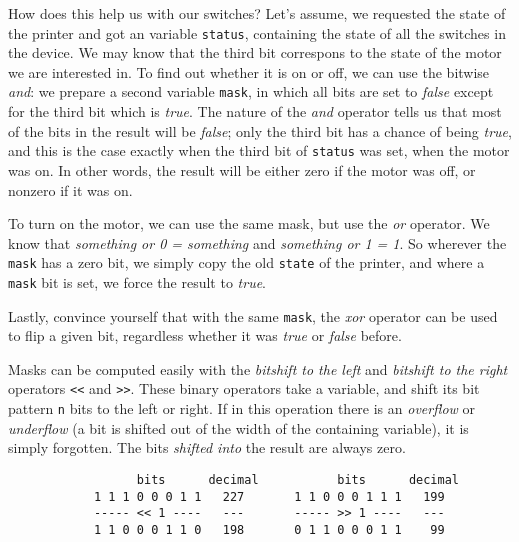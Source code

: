 {How does this help us with our switches? Let's assume, we requested the state of the printer and got an  variable \texttt{status}, containing the state of all the switches in the device. We may know that the third bit correspons to the state of the motor we are interested in. To find out whether it is on or off, we can use the bitwise \emph{and}: we prepare a second  variable \texttt{mask}, in which all bits are set to \emph{false} except for the third bit which is \emph{true}. The nature of the \emph{and} operator tells us that most of the bits in the result will be \emph{false}; only the third bit has a chance of being \emph{true}, and this is the case exactly when the third bit of \texttt{status} was set, \ie when the motor was on. In other words, the result will be either zero if the motor was off, or nonzero if it was on.

To turn on the motor, we can use the same mask, but use the \emph{or} operator. We know that \emph{something or 0 = something} and \emph{something or 1 = 1}. So wherever the \texttt{mask} has a zero bit, we simply copy the old \texttt{state} of the printer, and where a \texttt{mask} bit is set, we force the result to \emph{true}.

Lastly, convince yourself that with the same \texttt{mask}, the \emph{xor} operator can be used to flip a given bit, regardless whether it was \emph{true} or \emph{false} before.

Masks can be computed easily with the \emph{bitshift to the left} and \emph{bitshift to the right} operators \texttt{<{}<} and \texttt{>{}>}. These binary operators take a variable, and shift its bit pattern \texttt{n} bits to the left or right. If in this operation there is an \emph{overflow} or \emph{underflow} (a bit is shifted out of the width of the containing variable), it is simply forgotten. The bits \emph{shifted into} the result are always zero.

\begin{defbox}
\begin{verbatim}
                  bits      decimal           bits      decimal
            1 1 1 0 0 0 1 1   227       1 1 0 0 0 1 1 1   199
            ----- << 1 ----   ---       ----- >> 1 ----   ---
            1 1 0 0 0 1 1 0   198       0 1 1 0 0 0 1 1    99
\end{verbatim}
\end{defbox}

}
